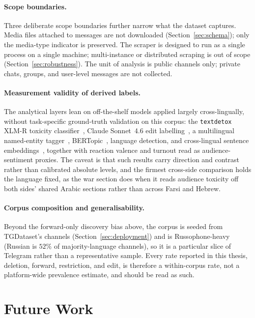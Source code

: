 \paragraph{Scope boundaries.}
Three deliberate scope boundaries further narrow what the dataset captures. Media files attached to messages are not downloaded (Section~\ref{sec:schema}); only the media-type indicator is preserved. The scraper is designed to run as a single process on a single machine; multi-instance or distributed scraping is out of scope (Section~\ref{sec:robustness}). The unit of analysis is public channels only; private chats, groups, and user-level messages are not collected.

\paragraph{Measurement validity of derived labels.}
The analytical layers lean on off-the-shelf models applied largely cross-lingually, without task-specific ground-truth validation on this corpus: the \texttt{textdetox} XLM-R toxicity classifier~\cite{dementieva2024}, Claude Sonnet~4.6 edit labelling~\cite{claudesonnet2026}, a multilingual named-entity tagger~\cite{tedeschi2021}, BERTopic~\cite{grootendorst2022}, language detection, and cross-lingual sentence embeddings~\cite{reimers2020}, together with reaction valence and turnout read as audience-sentiment proxies. The caveat is that such results carry direction and contrast rather than calibrated absolute levels, and the firmest cross-side comparison holds the language fixed, as the war section does when it reads audience toxicity off both sides' shared Arabic sections rather than across Farsi and Hebrew.

\paragraph{Corpus composition and generalisability.}
Beyond the forward-only discovery bias above, the corpus is seeded from TGDataset's channels (Section~\ref{sec:deployment}) and is Russophone-heavy (Russian is $52\%$ of majority-language channels), so it is a particular slice of Telegram rather than a representative sample. Every rate reported in this thesis, deletion, forward, restriction, and edit, is therefore a within-corpus rate, not a platform-wide prevalence estimate, and should be read as such.

\section{Future Work}

